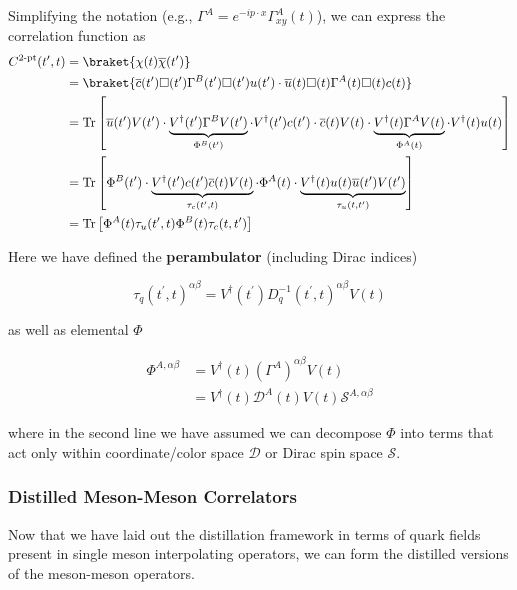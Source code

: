 \begin{table}
Simplifying the notation (e.g., \(\Gamma^A = e^{-ip\cdot x} \Gamma^A_{xy}(t)\)), we can express the correlation function as 
\begin{align}
C^{2\text{-pt}}(t^\prime, t) &= \braket{\chi(t) \overline{\chi}(t^\prime)} \\
&= \braket{
\overline{c}(t^\prime) \Box(t^\prime) \Gamma^B(t^\prime) \Box(t^\prime) u(t^\prime) \cdot
\overline{u}(t) \Box(t) \Gamma^A(t) \Box(t) c(t)
} \\ 
&= \text{Tr}\left[
    \overline{u}(t^\prime) V(t^\prime) \cdot 
    \underbrace{V^\dagger(t^\prime) \Gamma^B V(t^\prime)}_{\Phi^B(t^\prime)} \cdot 
    V^\dagger(t^\prime) c(t^\prime) \cdot 
    \overline{c}(t) V(t) \cdot 
    \underbrace{V^\dagger(t) \Gamma^A V(t)}_{\Phi^A(t)} \cdot 
    V^\dagger(t) u(t)
\right] \\
&= \text{Tr} \left[\Phi^B(t^\prime) \cdot 
    \underbrace{V^\dagger(t^\prime) c(t^\prime) \overline{c}(t) V(t)}_{\tau_c(t^\prime, t)} \cdot 
    \Phi^A(t) \cdot 
    \underbrace{V^\dagger(t) u(t) \overline{u}(t^\prime) V(t^\prime)}_{\tau_u(t, t^\prime)}
\right] \\
&= \text{Tr}\left[\Phi^A(t) \tau_u(t^\prime, t) \Phi^B(t) \tau_c(t, t^\prime)\right]
\end{align}

Here we have defined the \textbf{perambulator} (including Dirac indices)

\begin{equation}
\tau_q(t^\prime, t)^{\alpha \beta} = V^\dagger(t^\prime) D^{-1}_q(t^\prime, t)^{\alpha \beta} V(t)
\end{equation}

as well as elemental $\Phi$
    
\begin{align}
\Phi^{A, \alpha\beta} 
&= V^\dagger(t) (\Gamma^A)^{\alpha \beta} V(t) \\
&= V^\dagger(t) \mathcal D^A(t)V(t) \mathcal S^{A, \alpha \beta}
\end{align}

where in the second line we have assumed we can decompose \(\Phi\) into terms that act only within coordinate/color space \(\mathcal{D}\) or Dirac spin space \(\mathcal{S}\).

\subsubsection{Distilled Meson-Meson Correlators}

Now that we have laid out the distillation framework in terms of quark fields present in single meson interpolating operators, we can form the distilled versions of the meson-meson operators. 


\end{table}
